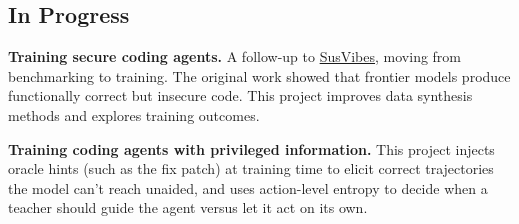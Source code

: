 \documentclass[a4paper,10pt]{article}
\begin{document}
\subsection*{In Progress}
\noindent\textbf{Training secure coding agents.} A follow-up to \href{https://arxiv.org/abs/2512.03262}{SusVibes}, moving from benchmarking to training. The original work showed that frontier models produce functionally correct but insecure code. This project improves data synthesis methods and explores training outcomes.

\vspace{3pt}
\noindent\textbf{Training coding agents with privileged information.} This project injects oracle hints (such as the fix patch) at training time to elicit correct trajectories the model can't reach unaided, and uses action-level entropy to decide when a teacher should guide the agent versus let it act on its own.
\end{document}
